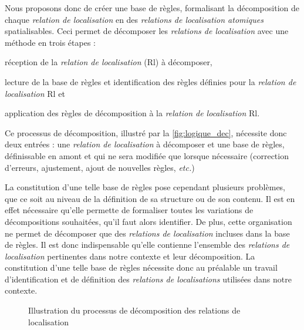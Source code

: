 Nous proposons donc de créer une base de règles, formalisant la
décomposition de chaque \emph{relation de localisation} en des
\emph{relations de localisation atomiques} spatialisables. Ceci permet
de décomposer les \emph{relations de localisation} avec une méthode en
trois étapes :
%
\begin{enumerate*}[label=(\arabic*)] 
\item réception de la \emph{relation de localisation}
  ($\text{Rl}$) à décomposer,
\item lecture de la base de règles et identification des règles
  définies pour la \emph{relation de localisation}
  $\text{Rl}$ et
\item application des règles de décomposition à la \emph{relation de
    localisation} $\text{Rl}$.
\end{enumerate*}
%
Ce processus de décomposition, illustré par la
\autoref{fig:logique_dec}, nécessite donc deux entrées : une
\emph{relation de localisation} à décomposer et une base de règles,
définissable en amont et qui ne sera modifiée que lorsque nécessaire
(\eg correction d'erreurs, ajustement, ajout de nouvelles règles,
\emph{etc.})

La constitution d'une telle base de règles pose cependant plusieurs
problèmes, que ce soit au niveau de la définition de sa structure ou
de son contenu. Il est en effet nécessaire qu'elle permette de
formaliser toutes les variations de décompositions souhaitées, qu'il
faut alors identifier. De plus, cette organisation ne permet de
décomposer que des \emph{relations de localisation} incluses dans la
base de règles. Il est donc indispensable qu'elle contienne l'ensemble
des \emph{relations de localisation} pertinentes dans notre contexte
et leur décomposition. La constitution d'une telle base de règles
nécessite donc au préalable un travail d'identification et de
définition des \emph{relations de localisations} utilisées dans notre
contexte.

\begin{figure}
  \centering
  
  \caption{Illustration du processus de décomposition des relations de
  localisation}
  \label{fig:logique_dec}
\end{figure}

